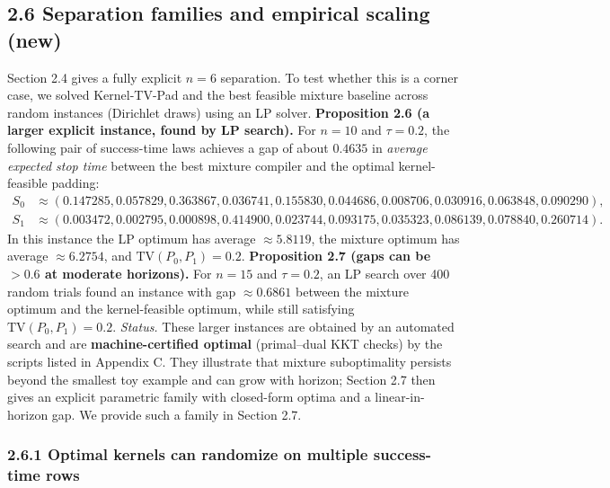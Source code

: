 \documentclass[11pt]{article}
\begin{document}
\hypertarget{separation-families-and-empirical-scaling-new}{%
\subsection{2.6 Separation families and empirical scaling
(new)}\label{separation-families-and-empirical-scaling-new}}

Section 2.4 gives a fully explicit \(n=6\) separation. To test whether
this is a corner case, we solved Kernel-TV-Pad and the best feasible
mixture baseline across random instances (Dirichlet draws) using an LP
solver. \textbf{Proposition 2.6 (a larger explicit instance, found by LP
search).} For \(n=10\) and \(\tau=0.2\), the following pair of
success-time laws achieves a gap of about \(0.4635\) in \emph{average
expected stop time} between the best mixture compiler and the optimal
kernel-feasible padding: \[
\begin{aligned}
S_0&\approx (0.147285,0.057829,0.363867,0.036741,0.155830,0.044686,0.008706,0.030916,0.063848,0.090290),\\
S_1&\approx (0.003472,0.002795,0.000898,0.414900,0.023744,0.093175,0.035323,0.086139,0.078840,0.260714).
\end{aligned}
\] In this instance the LP optimum has average \(\approx 5.8119\), the
mixture optimum has average \(\approx 6.2754\), and
\(\mathrm{TV}(P_0,P_1)=0.2\). \textbf{Proposition 2.7 (gaps can be
\(>0.6\) at moderate horizons).} For \(n=15\) and \(\tau=0.2\), an LP
search over 400 random trials found an instance with gap
\(\approx 0.6861\) between the mixture optimum and the kernel-feasible
optimum, while still satisfying \(\mathrm{TV}(P_0,P_1)=0.2\).
\emph{Status.} These larger instances are obtained by an automated
search and are \textbf{machine-certified optimal} (primal--dual KKT
checks) by the scripts listed in Appendix C. They illustrate that
mixture suboptimality persists beyond the smallest toy example and can
grow with horizon; Section 2.7 then gives an explicit parametric family
with closed-form optima and a linear-in-horizon gap. We provide such a
family in Section 2.7.

\hypertarget{optimal-kernels-can-randomize-on-multiple-success-time-rows}{%
\subsubsection{2.6.1 Optimal kernels can randomize on multiple
success-time
rows}\label{optimal-kernels-can-randomize-on-multiple-success-time-rows}}
\end{document}
